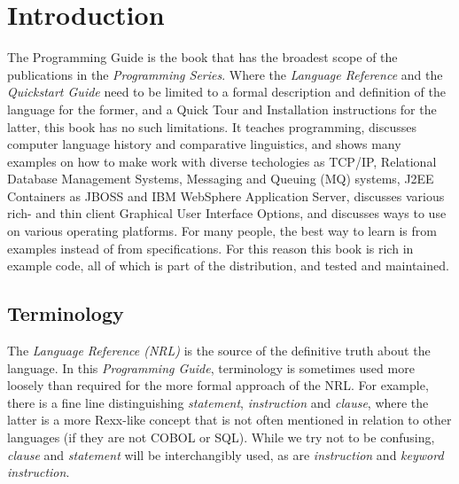 \chapter*{Introduction}
The Programming Guide is the book that has the broadest scope of the publications in the \emph{\nr{} Programming Series}. Where the \emph{Language Reference} and the \emph{Quickstart Guide} need to be limited to a formal description and definition of the \nr{} language for the former, and a Quick Tour and Installation instructions for the latter, this book has no such limitations. It teaches programming, discusses computer language history and comparative linguistics, and shows many examples on how to make \nr{} work with diverse techologies as TCP/IP, Relational Database Management Systems, Messaging and Queuing (MQ\textsuperscript{\texttrademark}) systems, J2EE Containers as JBOSS\textsuperscript{\texttrademark} and IBM WebSphere Application Server\textsuperscript{\texttrademark}, discusses various rich- and thin client Graphical User Interface Options, and discusses ways to use \nr{} on various operating platforms. For many people, the best way to learn is from examples instead of from specifications. For this reason this book is rich in example code, all of which is part of the \nr{} distribution, and tested and maintained. 
\section*{Terminology}
The \emph{\nr{} Language Reference (NRL)} is the source of the definitive truth about the language. In this \emph{Programming Guide}, terminology is sometimes used more loosely than required for the more formal approach of the NRL. For example, there is a fine line distinguishing \emph{statement}, \emph{instruction} and \emph{clause}, where the latter is a more Rexx-like concept that is not often mentioned in relation to other languages (if they are not COBOL or SQL). While we try not to be confusing, \emph{clause} and \emph{statement} will be interchangibly used, as are \emph{instruction} and \emph{keyword instruction}.
